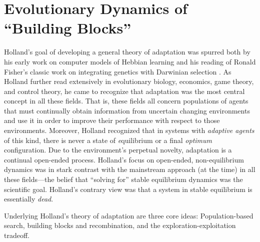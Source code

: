 \documentclass{sig-alternate}
\begin{document}
\section{Evolutionary Dynamics of ``Building Blocks''}  

Holland's goal of developing a general theory of adaptation was
spurred both by his early work on computer models of Hebbian learning
\cite{Rochester1956} and his reading of Ronald Fisher's classic work
on integrating genetics with Darwinian selection \cite{Fisher1930}.
As Holland further read extensively in evolutionary biology,
economics, game theory, and control theory, he came to recognize that
adaptation was the most central concept in all these fields.  That is,
these fields all concern populations of agents that must continually
obtain information from uncertain changing environments and use it in
order to improve their performance with respect to those environments.
Moreover, Holland recognized that in systems with {\em adaptive
  agents} of this kind, there is never a state of {\emph equilibrium}
or a final \emph{optimum} configuration.  Due to the environment's
perpetual novelty,
adaptation is a continual 
open-ended process.  Holland's focus on open-ended,
non-equilibrium dynamics was in stark contrast with the mainstream
approach (at the time) in all these fields---the belief that ``solving
for'' stable equilibrium dynamics was the scientific goal.  Holland's
contrary view was that a system in stable equilibrium is essentially
\emph{dead}.


Underlying Holland's theory of adaptation are three core ideas:
Population-based search, building blocks and recombination, and the
exploration-exploitation tradeoff.
\end{document}

